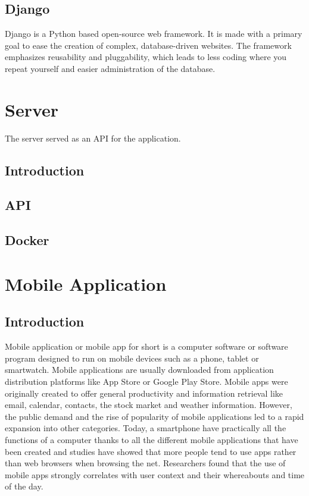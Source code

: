\documentclass[12pt, letterpaper, twoside]{article}
\begin{document}
\subsection{Django}
Django is a Python based open-source web framework. It is made with a primary goal to ease the creation of complex, database-driven websites. The framework emphasizes reusability and pluggability, which leads to less coding where you repeat yourself and easier administration of the database. 

\section{Server}
The server served as an API for the application. 
\subsection{Introduction}
\subsection{API}
\subsection{Docker}
\section{Mobile Application}
\subsection{Introduction}
Mobile application or mobile app for short is a computer software or software program designed to run on mobile devices such as a phone, tablet or smartwatch. Mobile applications are usually downloaded from application distribution platforms like App Store or Google Play Store. Mobile apps were originally created to offer general productivity and information retrieval like email, calendar, contacts, the stock market and weather information. However, the public demand and the rise of popularity of mobile applications led to a rapid expansion into other categories. Today, a smartphone have practically all the functions of a computer thanks to all the different mobile applications that have been created and studies have showed that more people tend to use apps rather than web browsers when browsing the net. Researchers found that the use of mobile apps strongly correlates with user context and their whereabouts and time of the day. \\ 
\end{document}
